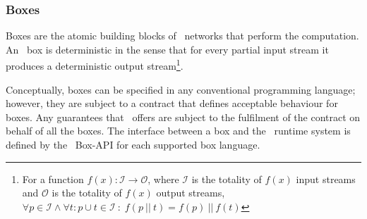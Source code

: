     \subsubsection*{Boxes}
Boxes are the atomic building blocks of \ak\ networks that perform the computation. An \ak\ box is deterministic in the sense that for every partial input stream it produces a deterministic output stream\footnote{For a function $f(x): \mathcal{I} \to \mathcal{O}$, where $\mathcal{I}$ is the totality of $f(x)$ input streams and $\mathcal{O}$ is the totality of $f(x)$ output streams, $\forall p \in \mathcal{I} \land \forall t:p \cup t \in \mathcal{I} \: : \; f(p \:||\: t) = f(p) \:||\: f(t)$}.

Conceptually, boxes can be specified in any conventional programming language; however, they are subject to a contract that defines acceptable behaviour for boxes. Any guarantees that \ak\ offers are subject to the fulfilment of the contract on behalf of all the boxes. The interface between a box and the \ak\ runtime system is defined by the \ak\ Box-API for each supported box language.


